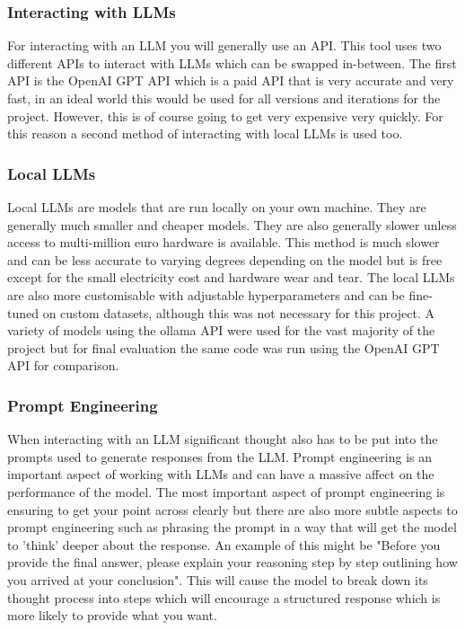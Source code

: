 \documentclass[12pt]{extarticle}
\begin{document}
\subsubsection{Interacting with LLMs}

For interacting with an LLM you will generally use an API. This tool uses two different APIs to interact with LLMs which can be swapped in-between. The first API is the OpenAI GPT API which is a paid API that is very accurate and very fast, in an ideal world this would be used for all versions and iterations for the project. However, this is of course going to get very expensive very quickly. For this reason a second method of interacting with local LLMs is used too.

\subsubsection{Local LLMs}

Local LLMs are models that are run locally on your own machine. They are generally much smaller and cheaper models. They are also generally slower unless access to multi-million euro hardware is available. This method is much slower and can be less accurate to varying degrees depending on the model but is free except for the small electricity cost and hardware wear and tear. The local LLMs are also more customisable with adjustable hyperparameters and can be fine-tuned on custom datasets, although this was not necessary for this project. A variety of models using the ollama API were used for the vast majority of the project but for final evaluation the same code was run using the OpenAI GPT API for comparison.

\subsubsection{Prompt Engineering}

When interacting with an LLM significant thought also has to be put into the prompts used to generate responses from the LLM. Prompt engineering is an important aspect of working with LLMs and can have a massive affect on the performance of the model. The most important aspect of prompt engineering is ensuring to get your point across clearly but there are also more subtle aspects to prompt engineering such as phrasing the prompt in a way that will get the model to 'think' deeper about the response. An example of this might be "Before you provide the final answer, please explain your reasoning step by step outlining how you arrived at your conclusion". This will cause the model to break down its thought process into steps which will encourage a structured response which is more likely to provide what you want.
\end{document}
